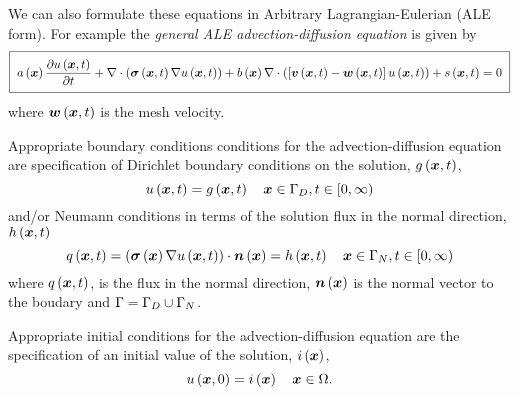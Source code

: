 We can also formulate these equations in Arbitrary Lagrangian-Eulerian (ALE
form). For example the \emph{general ALE advection-diffusion equation} is
given by
\begin{equation}
  \addtolength{\fboxsep}{3pt}
  \boxed{
    \fnof{a}{\vectr{x}}\delby{\fnof{u}{\vectr{x},t}}{t}+\divergence{}{\pbrac{\fnof{\tensor{\sigma}}{\vectr{x},t}
        \gradient{}{\fnof{u}{\vectr{x},t}}}}+\fnof{b}{\vectr{x}}\divergence{}{\pbrac{\sqbrac{\fnof{\vectr{v}}{\vectr{x},t}
          -\fnof{\vectr{w}}{\vectr{x},t}}\fnof{u}{\vectr{x},t}}}+\fnof{s}{\vectr{x},t}=0
  }
  \label{eqn:GeneralALEAdvectionDiffusionEquation}
\end{equation}
where $ \boldsymbol{w}\left( \boldsymbol{x},t \right) $ is the mesh velocity.

Appropriate boundary conditions conditions for the advection-diffusion
equation are specification of Dirichlet boundary conditions on the solution,
$ g\left( \boldsymbol{x},t \right) $, \ie
\begin{equation}
  \fnof{u}{\vectr{x},t} = \fnof{g}{\vectr{x},t} \quad \vectr{x}\in\Gamma_{D},t\in[0,\infty)
  \label{eqn:AdvectionDiffusionDirichletBC} 
\end{equation}
and/or Neumann conditions in terms of the solution flux in the normal
direction, $ h\left( \boldsymbol{x},t \right) $ \ie
\begin{equation}
  \fnof{q}{\vectr{x},t} = \dotprod{\pbrac{\fnof{\tensor{\sigma}}{\vectr{x}}
      \gradient{}{\fnof{u}{\vectr{x},t}}}}{\fnof{\normal}{\vectr{x}}} =
  \fnof{h}{\vectr{x},t} \quad \vectr{x}\in\Gamma_{N},t\in[0,\infty)
  \label{eqn:AdvectionDiffusionNeumannBC} 
\end{equation}
where $ q\left( \boldsymbol{x},t \right) $, is the flux in the normal direction, $ \boldsymbol{n}\left( \boldsymbol{x} \right) $ is the normal
vector to the boudary and $\Gamma=\Gamma_{D}\cup\Gamma_{N}$.

Appropriate initial conditions for the advection-diffusion equation are the
specification of an initial value of the solution, $ i\left( \boldsymbol{x} \right) $, \ie
\begin{equation}
  \fnof{u}{\vectr{x},0} = \fnof{i}{\vectr{x}} \quad \vectr{x}\in\Omega.
  \label{eqn:AdvectionDiffusionInitialC} 
\end{equation}


